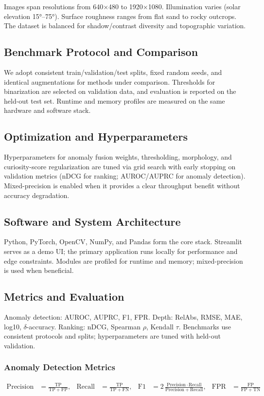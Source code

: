 \documentclass[12pt]{article}
\begin{document}
Images span resolutions from 640×480 to 1920×1080. Illumination varies (solar elevation 15°–75°). Surface roughness ranges from flat sand to rocky outcrops. The dataset is balanced for shadow/contrast diversity and topographic variation.

\subsection{Benchmark Protocol and Comparison}
We adopt consistent train/validation/test splits, fixed random seeds, and identical augmentations for methods under comparison. Thresholds for binarization are selected on validation data, and evaluation is reported on the held-out test set. Runtime and memory profiles are measured on the same hardware and software stack.

\subsection{Optimization and Hyperparameters}
Hyperparameters for anomaly fusion weights, thresholding, morphology, and curiosity-score regularization are tuned via grid search with early stopping on validation metrics (nDCG for ranking; AUROC/AUPRC for anomaly detection). Mixed-precision is enabled when it provides a clear throughput benefit without accuracy degradation.

\subsection{Software and System Architecture}
Python, PyTorch, OpenCV, NumPy, and Pandas form the core stack. Streamlit serves as a demo UI; the primary application runs locally for performance and edge constraints. Modules are profiled for runtime and memory; mixed-precision is used when beneficial.

\subsection{Metrics and Evaluation}
Anomaly detection: AUROC, AUPRC, F1, FPR. Depth: RelAbs, RMSE, MAE, log10, $\delta$-accuracy. Ranking: nDCG, Spearman $\rho$, Kendall $\tau$. Benchmarks use consistent protocols and splits; hyperparameters are tuned with held-out validation.

\subsubsection{Anomaly Detection Metrics}
\begin{align}
\mathrm{Precision} &= \frac{\mathrm{TP}}{\mathrm{TP}+\mathrm{FP}}, &
\mathrm{Recall} &= \frac{\mathrm{TP}}{\mathrm{TP}+\mathrm{FN}}, &
\mathrm{F1} &= 2\,\frac{\mathrm{Precision}\cdot\mathrm{Recall}}{\mathrm{Precision}+\mathrm{Recall}}, &
\mathrm{FPR} &= \frac{\mathrm{FP}}{\mathrm{FP}+\mathrm{TN}}
\end{align}
\end{document}
